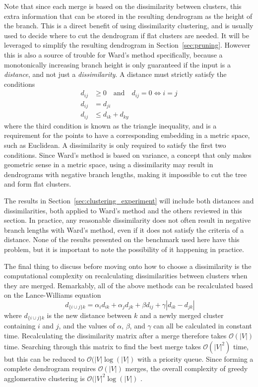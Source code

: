 Note that since each merge is based on the dissimilarity between clusters, this extra information that can be stored in the resulting dendrogram as the height of the branch. This is a direct benefit of using dissimilarity clustering, and is usually used to decide where to cut the dendrogram if flat clusters are needed. It will be leveraged to simplify the resulting dendrogram in Section~\ref{sec:pruning}.
However this is also a source of trouble for Ward's method specifically, because a monotonically increasing branch height is only guaranteed if the input is a \emph{distance}, and not just a \emph{dissimilarity}.
A distance must strictly satisfy the conditions
\begin{equation}
\begin{aligned}
    d_{ij} & \geq 0 \quad\text{and}\quad d_{ij}=0 \Leftrightarrow i=j \\
    d_{ij} & = d_{ji} \\
    d_{ij} & \leq d_{ik} + d_{ky}
\end{aligned}
\end{equation}
where the third condition is known as the triangle inequality, and is a requirement for the points to have a corresponding embedding in a metric space, such as Euclidean.
A dissimilarity is only required to satisfy the first two conditions.
Since Ward's method is based on variance, a concept that only makes geometric sense in a metric space, using a dissimilarity may result in dendrograms with negative branch lengths, making it impossible to cut the tree and form flat clusters.

The results in Section~\ref{sec:clustering_experiment} will include both distances and dissimilarities, both applied to Ward's method and the others reviewed in this section.
In practice, any reasonable dissimilarity does not often result in negative branch lengths with Ward's method, even if it does not satisfy the criteria of a distance. None of the results presented on the benchmark used here have this problem, but it is important to note the possibility of it happening in practice.

The final thing to discuss before moving onto how to choose a dissimilarity is the computational complexity on recalculating dissimilarities between clusters when they are merged. Remarkably, all of the above methods can be recalculated based on the Lance-Williams equation
\begin{equation}
    \;d_{\{i\cup j\}k} = \alpha_i d_{ik} + \alpha_j d_{jk} + \beta d_{ij} + \gamma|d_{ik}-d_{jk}|
    \label{eq:lancewilliams}
\end{equation}
where $d_{\{i\cup j\}k}$ is the new distance between $k$ and a newly merged cluster containing $i$ and $j$, and the values of $\alpha$, $\beta$, and $\gamma$ can all be calculated in constant time.
Recalculating the dissimilarity matrix after a merge therefore takes $\mathcal{O}(|V|)$ time. Searching through this matrix to find the best merge takes $\mathcal{O}(|V|^2)$ time, but this can be reduced to $\mathcal{O}(|V|\log(|V|)$ with a priority queue. Since forming a complete dendrogram requires $\mathcal{O}(|V|)$ merges, the overall complexity of greedy agglomerative clustering is $\mathcal{O}(|V|^2\log(|V|)$ .


